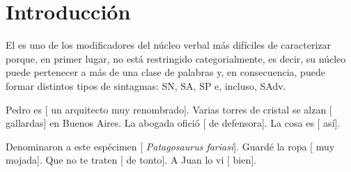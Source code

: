 \newcommand*{\flechasA}{%
\begin{tikzpicture}[baseline=(s.base), node distance=0pt,
              every node/.style={inner sep=1pt}]
            \node (s) {[\etq{Suj} Pedro]};
            \node[right=4pt of s] (v) {[\etq{Pred} \etq{V}es};
            \node[right=3pt of v] (p) {\etq{Pvo}[un arquitecto muy renombrado]]};
            \draw[->, >=Stealth] (p.south) .. controls +(0,-.5) and +(0,-.5) .. (s.south);
          \end{tikzpicture}}
\newcommand*{\flechasB}{%
\scalebox{.9}{\begin{tikzpicture}[baseline=(s.base), node distance=0pt,
              every node/.style={inner sep=1pt}]
            \node (s) {[\etq{Suj} La ciencia]};
            \node[right=2pt of s] (v) {[\etq{Pred} \etq{V}denominó};
            \node[right=3pt of v] (o) {\etq{OD}[a este espécimen]};
            \node[right=3pt of o] (p) {\etq{Pvo}[\textit{Patagosaurus fariasi}]]};
            \draw[->, >=Stealth] (p.south) .. controls +(0,-.5) and +(0,-.5) .. (o.south);
          \end{tikzpicture}}}


\section{Introducción}

El  es uno de los modificadores del núcleo verbal más
difíciles de caracterizar porque, en primer lugar, no está restringido
categorialmente, es decir, su núcleo puede pertenecer a más de una clase de
palabras y, en consecuencia, puede formar distintos tipos de sintagmas: SN, SA,
SP e, incluso, SAdv.

\begin{exe}
  \ex\label{ex:09-cat1}
    \begin{xlist}
      \ex\label{ex:09-cat1-a} Pedro es [ un arquitecto muy renombrado].
      \ex\label{ex:09-cat1-b} Varias torres de cristal se alzan [
          gallardas] en Buenos Aires.
      \ex La abogada ofició [ de defensora].
      \ex La cosa es [ así].
    \end{xlist}
  \ex\label{ex:09-cat2}
    \begin{xlist}
      \ex\label{ex:09-cat2-a} Denominaron a este espécimen [
          \textit{Patagosaurus fariasi}].
      \ex\label{ex:09-cat2-b} Guardé la ropa [ muy mojada].
      \ex Que no te traten [ de tonto].
      \ex A Juan lo vi [ bien].
    \end{xlist}
\end{exe}


